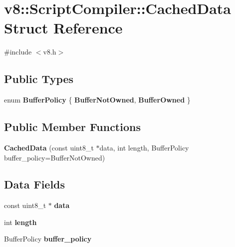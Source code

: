 \hypertarget{structv8_1_1ScriptCompiler_1_1CachedData}{\section{v8\-:\-:Script\-Compiler\-:\-:Cached\-Data Struct Reference}
\label{structv8_1_1ScriptCompiler_1_1CachedData}
}


{\ttfamily \#include $<$v8.\-h$>$}

\subsection*{Public Types}
\begin{DoxyCompactItemize}
\item 
enum {\bfseries Buffer\-Policy} \{ {\bfseries Buffer\-Not\-Owned}, 
{\bfseries Buffer\-Owned}
 \}
\end{DoxyCompactItemize}
\subsection*{Public Member Functions}
\begin{DoxyCompactItemize}
\item 
\hypertarget{structv8_1_1ScriptCompiler_1_1CachedData_ab45b2bd22aa86eafd0b8eecbdc72d44e}{{\bfseries Cached\-Data} (const uint8\-\_\-t $\ast$data, int length, Buffer\-Policy buffer\-\_\-policy=Buffer\-Not\-Owned)}\label{structv8_1_1ScriptCompiler_1_1CachedData_ab45b2bd22aa86eafd0b8eecbdc72d44e}

\end{DoxyCompactItemize}
\subsection*{Data Fields}
\begin{DoxyCompactItemize}
\item 
\hypertarget{structv8_1_1ScriptCompiler_1_1CachedData_a31e313a969170116f98d5a76c110fe61}{const uint8\-\_\-t $\ast$ {\bfseries data}}\label{structv8_1_1ScriptCompiler_1_1CachedData_a31e313a969170116f98d5a76c110fe61}

\item 
\hypertarget{structv8_1_1ScriptCompiler_1_1CachedData_ad7b8b1b672095a2c33621d3d5b5c7f8f}{int {\bfseries length}}\label{structv8_1_1ScriptCompiler_1_1CachedData_ad7b8b1b672095a2c33621d3d5b5c7f8f}

\item 
\hypertarget{structv8_1_1ScriptCompiler_1_1CachedData_a1e5c9ff625ac790139aec4294493fe32}{Buffer\-Policy {\bfseries buffer\-\_\-policy}}\label{structv8_1_1ScriptCompiler_1_1CachedData_a1e5c9ff625ac790139aec4294493fe32}

\end{DoxyCompactItemize}



